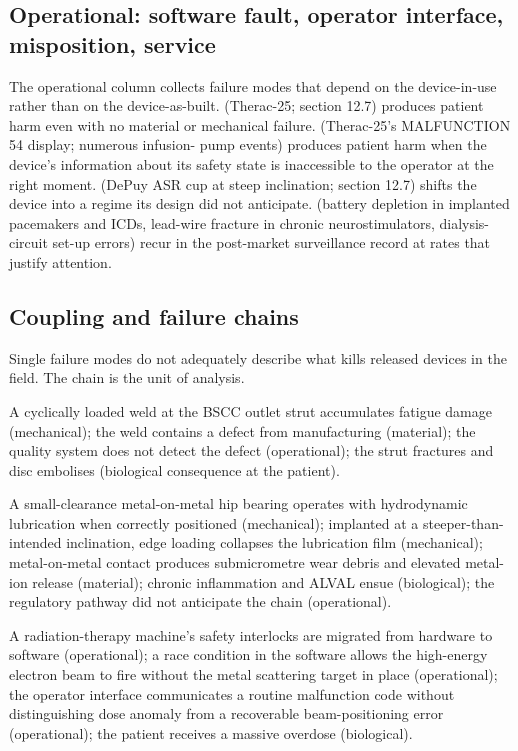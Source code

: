 \subsection{Operational: software fault, operator interface, misposition, service}

The operational column collects failure modes that depend on the
device-in-use rather than on the device-as-built.  (Therac-25; section 12.7) produces patient harm even with
no material or mechanical failure.  (Therac-25's MALFUNCTION 54 display; numerous infusion-
pump events) produces patient harm when the device's information
about its safety state is inaccessible to the operator at the
right moment.  (DePuy ASR cup at steep
inclination; section 12.7) shifts the device into a regime its
design did not anticipate.  (battery
depletion in implanted pacemakers and ICDs, lead-wire fracture in
chronic neurostimulators, dialysis-circuit set-up errors) recur
in the post-market surveillance record at rates that justify
attention.

\subsection{Coupling and failure chains}

Single failure modes do not adequately describe what kills
released devices in the field. The chain is the unit of analysis.

A cyclically loaded weld at the BSCC outlet strut accumulates
fatigue damage (mechanical); the weld contains a defect from
manufacturing (material); the quality system does not detect the
defect (operational); the strut fractures and disc embolises
(biological consequence at the patient).

A small-clearance metal-on-metal hip bearing operates with
hydrodynamic lubrication when correctly positioned (mechanical);
implanted at a steeper-than-intended inclination, edge loading
collapses the lubrication film (mechanical); metal-on-metal
contact produces submicrometre wear debris and elevated metal-ion
release (material); chronic inflammation and ALVAL ensue
(biological); the regulatory pathway did not anticipate the
chain (operational).

A radiation-therapy machine's safety interlocks are migrated from
hardware to software (operational); a race condition in the
software allows the high-energy electron beam to fire without
the metal scattering target in place (operational); the operator
interface communicates a routine malfunction code without
distinguishing dose anomaly from a recoverable beam-positioning
error (operational); the patient receives a massive overdose
(biological).

